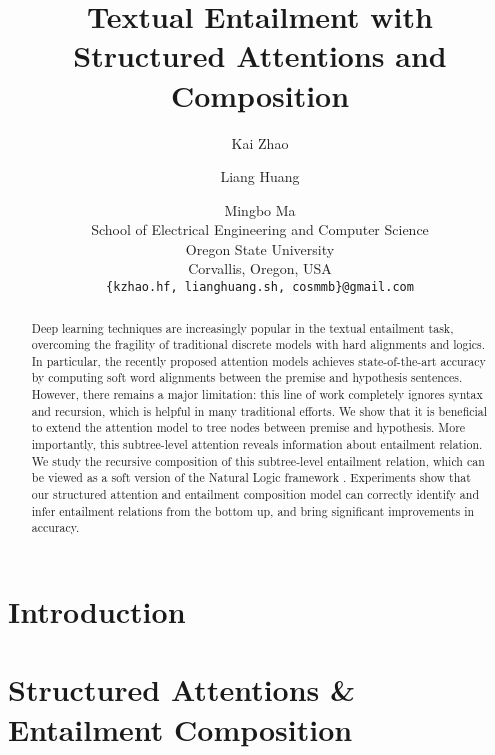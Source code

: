 \documentclass[11pt,letterpaper]{article}
\title{Textual Entailment with Structured Attentions and Composition}
\author{Kai Zhao \and Liang Huang \and Mingbo Ma \\
School of Electrical Engineering and Computer Science \\ 
Oregon State University \\ Corvallis, Oregon, USA \\
{\tt \{kzhao.hf, lianghuang.sh, cosmmb\}@gmail.com}}
\date{}
\begin{document}
\maketitle

\vspace{-0.35in}
\begin{abstract}
Deep learning techniques are increasingly popular 
in the textual entailment task, %
overcoming the fragility of traditional discrete models with hard alignments and logics.
In particular, the recently proposed attention models 
\cite{rocktaschel2015reasoning,wang2015learning} achieves state-of-the-art accuracy by
computing soft word alignments between %
the premise and hypothesis sentences.
However, there remains a major limitation:
this line of work completely ignores syntax and recursion,
which is helpful in many traditional efforts.
We show that it is beneficial to extend the attention model 
to tree nodes between premise and hypothesis.
More importantly, this subtree-level
attention reveals information about entailment relation.
We study the recursive composition of this subtree-level entailment relation,
which can be viewed as a soft version of 
the Natural Logic framework
\cite{maccartney2009extended}.
Experiments show that our structured attention and
entailment composition model can correctly identify and infer
entailment relations from the bottom up,
and bring significant improvements in accuracy.
\end{abstract}


\section{Introduction}
\label{sec:intro}



\section{Structured Attentions \& Entailment Composition}
\label{sec:model}


\iffalse
\section{Structured Tree Entailment}
\label{sec:entailment}

\fi
\end{document}
